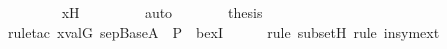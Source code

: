 \begin{isabellebody}
\ \ \ \ \ \ \isamarkupfalse%
\ xH\ \isanewline
\ \ \ \ \ \ \isamarkupfalse%
\ auto\ \isanewline
\ \ \isamarkupfalse%
\isanewline
\isanewline
\ \ \isamarkupfalse%
\ {\isacharquery}{\kern0pt}thesis\ \isanewline
\ \ \ \ \isamarkupfalse%
{\isacharparenleft}{\kern0pt}rule{\isacharunderscore}{\kern0pt}tac\ x{\isacharequal}{\kern0pt}{\isachardoublequoteopen}val{\isacharparenleft}{\kern0pt}G{\isacharcomma}{\kern0pt}\ sep{\isacharunderscore}{\kern0pt}Base{\isacharparenleft}{\kern0pt}A{\isacharparenright}{\kern0pt}\ {\isasymtimes}\ P{\isacharparenright}{\kern0pt}{\isachardoublequoteclose}\ \ bexI{\isacharparenright}{\kern0pt}\isanewline
\ \ \ \ \ \isamarkupfalse%
{\isacharparenleft}{\kern0pt}rule\ subsetH{\isacharcomma}{\kern0pt}\ rule\ insymext{\isacharparenright}{\kern0pt}\isanewline
\ \ \ \ \isamarkupfalse%
\isanewline
{}\isamarkupfalse%
%
\endisatagproof
{\isafoldproof}%
%
\isadelimproof
\isanewline
%
\endisadelimproof
\isanewline
{}\isamarkupfalse%
\isanewline
%
\isadelimtheory
%
\endisadelimtheory
%
\isatagtheory
{}\isamarkupfalse%
%
\endisatagtheory
{\isafoldtheory}%
%
\isadelimtheory
%
\endisadelimtheory
%
\end{isabellebody}%
\endinput

